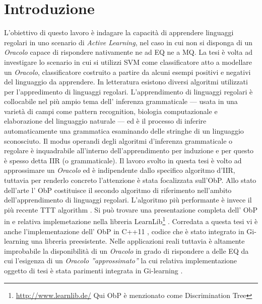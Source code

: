 

\chapter*{Introduzione} %
\label{cap:intro}

L'obiettivo di questo lavoro è indagare la capacità di apprendere linguaggi regolari in uno scenario di \textit{Active Learning}, nel caso in cui non si disponga di un \textit{Oracolo} capace di rispondere nativamente ne ad \ac{EQ} ne a \ac{MQ}. La tesi è volta ad investigare lo scenario in cui si utilizzi \ac{SVM} come classificatore atto a modellare un \textit{Oracolo}, classificatore costruito a partire da alcuni esempi positivi e negativi del linguaggio da apprendere. In letteratura esistono diversi algoritmi utilizzati per  l'appredimento di linguaggi regolari. L'apprendimento di linguaggi regolari è collocabile nel più ampio tema dell' inferenza grammaticale --- usata in una varietà di campi come pattern recognition, biologia computazionale e elaborazione del linguaggio naturale --- ed è il processo di inferire automaticamente una grammatica esaminando delle stringhe di un linguaggio sconosciuto.
Il modus operandi degli algoritmi d'inferenza grammaticale o regolare  è inquadrabile all'interno dell'apprendimento per induzione e per questo è spesso detta \ac{IIR}  (o grammaticale).
Il lavoro svolto in questa tesi è volto ad approssimare un \textit{Oracolo} ed è  indipendente dallo specifico algoritmo d'\ac{IIR}, tuttavia per renderlo concreto l'attenzione è stata focalizzata sull'\ac{ObP}.
Allo stato dell'arte l' \ac{ObP} costituisce il secondo algoritmo di riferimento nell'ambito dell'apprendimento di linguaggi regolari.  L'algoritmo più performante è invece il più recente TTT algorithm \cite{SteffenTTT14}.
Si può trovare una presentazione completa dell' \ac{ObP}  in \cite{Howar12} e relativa implemetazione nella libreria LearnLib\footnote{\href{http://www.learnlib.de/}{http://www.learnlib.de/} Qui \ac{ObP} è menzionato come Discrimination Tree} .  Corredata a questa tesi vi è anche l'implementazione dell' \ac{ObP} in C++11 , codice che è stato integrato in  Gi-learning \cite{Cot16} una libreria preesistente. Nelle applicazioni reali tuttavia è altamente improbabile la disponibilità di un \textit{Oracolo} in grado di rispondere a delle \ac{EQ} da cui l'esigenza di un \textit{Oracolo ''approssimato''} la cui relativa implementazione oggetto di tesi è stata parimenti integrata in  Gi-learning \cite{Cot16}.
